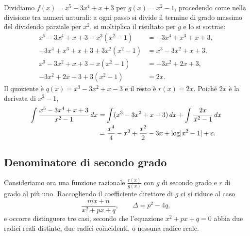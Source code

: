\begin{esempio}\label{es:divisione-polinomi}
Dividiamo $f(x)=x^{5}-3x^{4}+x+3$ per $g(x)=x^{2}-1$, procedendo come nella divisione tra
numeri naturali: a ogni passo si divide il termine di grado massimo del dividendo
parziale per $x^{2}$, si moltiplica il risultato per $g$ e lo si sottrae:
\[
\begin{aligned}
  x^{5}-3x^{4}+x+3-x^{3}(x^{2}-1)&=-3x^{4}+x^{3}+x+3,\\
  -3x^{4}+x^{3}+x+3+3x^{2}(x^{2}-1)&=x^{3}-3x^{2}+x+3,\\
  x^{3}-3x^{2}+x+3-x(x^{2}-1)&=-3x^{2}+2x+3,\\
  -3x^{2}+2x+3+3(x^{2}-1)&=2x .
\end{aligned}
\]
Il quoziente è $q(x)=x^{3}-3x^{2}+x-3$ e il resto è $r(x)=2x$. Poiché $2x$ è la derivata
di $x^{2}-1$,
\[
\begin{aligned}
  \int\frac{x^{5}-3x^{4}+x+3}{x^{2}-1}\,dx&=\int(x^{3}-3x^{2}+x-3)\,dx
  +\int\frac{2x}{x^{2}-1}\,dx\\
  &=\frac{x^{4}}4-x^{3}+\frac{x^{2}}2-3x+\log\lvert x^{2}-1\rvert+c .
\end{aligned}
\]
\end{esempio}

\subsection{Denominatore di secondo grado}

Consideriamo ora una funzione razionale $\frac{r(x)}{g(x)}$ con $g$ di secondo grado e $r$ di
grado al più uno. Raccogliendo il coefficiente direttore di $g$ ci si riduce al caso
\begin{equation}\label{eq:razionale-secondo-grado}
  \frac{mx+n}{x^{2}+px+q}, \qquad \Delta=p^{2}-4q ,
\end{equation}
e occorre distinguere tre casi, secondo che l'equazione $x^{2}+px+q=0$ abbia due radici
reali distinte, due radici coincidenti, o nessuna radice reale.

